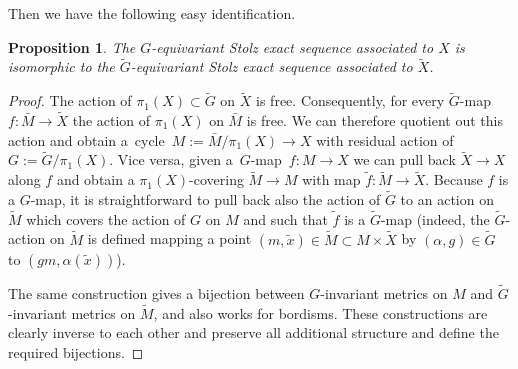 \documentclass[pdftex]{sigma}
\numberwithin{equation}{section}
\newtheorem{Proposition}[Theorem]{Proposition}
{ \theoremstyle{definition}
	\newtheorem{Definition}[Theorem]{Definition}
	\newtheorem{Note}[Theorem]{Note}
	\newtheorem{Example}[Theorem]{Example}
	\newtheorem{Remark}[Theorem]{Remark} }
\begin{document}
	
	Then we have the following easy identification.
	\begin{Proposition}\label{extension}
		The $G$-equivariant Stolz exact sequence associated to $X$ is isomorphic to
		the $\widetilde{G}$-equivariant Stolz exact sequence associated to
		$\tilde{X}$.
	\end{Proposition}
	\begin{proof}
		The action of $\pi_1(X)\subset \widetilde{G}$ on $\tilde X$ is
		free. Consequently, for every $\widetilde{G}$-map ${f\colon \bar M\to\tilde X}$ the
		action of $\pi_1(X)$ on $\bar M$ is free. We can therefore quotient out this
		action and obtain a~cycle~${M:=\bar M/\pi_1(X)\to X}$ with residual action of
		$G:=\widetilde{G}/\pi_1(X)$.
		Vice versa, given a~$G$-map~${f\colon M\to X}$ we can pull back $\tilde X\to
		X$ along $f$ and obtain a $\pi_1(X)$-covering $\tilde M\to M$ with map
		$\tilde f\colon \tilde M\to \tilde X$. Because $f$ is a $G$-map, it is
		straightforward to pull back
		also the action of $\widetilde{G}$ to an action on $\tilde M$ which covers
		the action of $G$ on $M$ and such that $\tilde f$ is a $\widetilde{G}$-map
		(indeed, the $\widetilde{G}$-action on $\tilde M$ is defined mapping a point
		$(m,\tilde x)\in \tilde M\subset M\times \tilde X$ by
		$(\alpha,g)\in\widetilde{G}$ to $(gm,\alpha(\tilde x))$).
		
		The same construction gives a bijection between $G$-invariant metrics on $M$
		and $\widetilde{G}$-invariant metrics on $\tilde M$, and also works for
		bordisms.
		These constructions are clearly inverse to each other and preserve all
		additional structure and define the required bijections.
	\end{proof}
	
\end{document}
